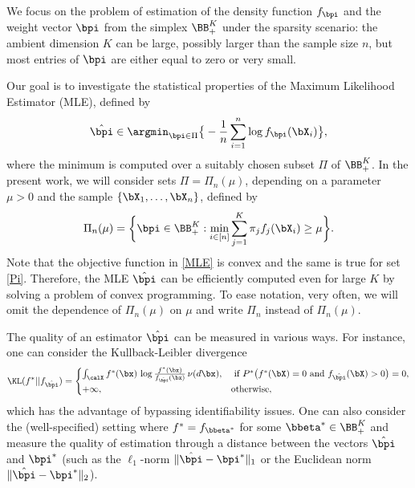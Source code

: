 We focus on the problem of estimation of the density function $f_{\bpi}$ and the weight vector $\bpi$ from the simplex
$\BB_+^K$ under the sparsity scenario: the ambient dimension $K$ can be large, possibly larger than the sample size
$n$, but most entries of $\bpi$ are either equal to zero or very small.

Our goal is to investigate the statistical properties of the Maximum Likelihood Estimator (MLE), defined by
\begin{equation}\label{MLE}
\hat\bpi \in \argmin_{\bpi\in \Pi}\big\{-\frac{1}{n}\sum_{i=1}^n\log f_{\bpi}(\bX_i)\big\},
\end{equation}
where the minimum is computed over a suitably chosen subset $\Pi$ of $\BB_+^K$. In the present work, we will consider
sets $\Pi=\Pi_n(\mu)$, depending on a parameter $\mu>0$ and the sample $\{\bX_1,\ldots,\bX_n\}$, defined by
\begin{equation}\label{Pi}
\Pi_n(\mu) = \bigg\{\bpi\in \BB_+^K: \min_{i\in [n]}\sum_{j=1}^K \pi_j f_j(\bX_i)\geq \mu\bigg\}.
\end{equation}
Note that the objective function in \eqref{MLE} is convex and the same is true for set \eqref{Pi}. Therefore, the MLE
$\hat\bpi$ can be efficiently computed even for large $K$ by solving a problem of convex programming. To ease notation, very often,
we will omit the dependence of $\Pi_n(\mu)$ on $\mu$ and write $\Pi_n$ instead of $\Pi_n(\mu)$.

The quality of an estimator $\hat\bpi$ can be measured in various ways. For instance, one can consider
the Kullback-Leibler divergence 
\begin{equation}
\KL(f^* ||f_{\hat\bpi}) = 
    \begin{cases}
    \int_{\calX} f^*(\bx)\,\log \frac{f^*(\bx)}{f_{\hat\bpi}(\bx)}\,\nu(d\bx), &
            \text{ if } P^*\big(f^*(\bX)=0 \text{ and } f_{\hat\bpi}(\bX)>0\big)=0, \\
    +\infty, & \text{otherwise},
    \end{cases}
\end{equation}
which has the advantage of bypassing identifiability
issues. One can also consider the (well-specified) setting where $f^*=f_{\bbeta^*}$ for some $\bbeta^*\in\BB^K_+$
and measure the quality of estimation through a distance between the vectors $\hat\bpi$ and $\bpi^*$ (such as
the $\ell_1$-norm $\|\hat\bpi-\bpi^*\|_1$ or the Euclidean norm $\|\hat\bpi-\bpi^*\|_2$).

